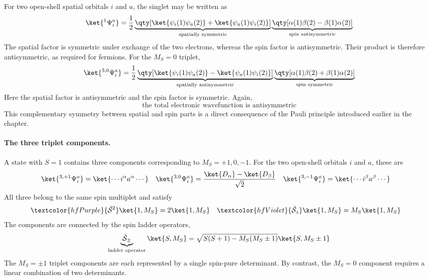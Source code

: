 \documentclass[11pt,a4paper,titlepage]{article}
\numberwithin{equation}{section}
\newcommand{\chS}{\Hat{\mathcal{S}}}
\newcommand{\purple}[1]{\textcolor{hfPurple}{#1}}
\newcommand{\red}[1]{\textcolor{hfRed}{#1}}
\newcommand{\green}[1]{\textcolor{hfGreen}{#1}}
\newcommand{\violet}[1]{\textcolor{hfViolet}{#1}}
\begin{document}
For two open-shell spatial orbitals $i$ and $a$, the singlet may be written
as
\begin{equation}
  \ket{{}^1\Psi_i^a}
  =
  \frac{1}{2}
  \underbrace{
  \qty[
    \ket{\psi_i(1)\psi_a(2)}
    +
    \ket{\psi_a(1)\psi_i(2)}
  ]}_{\text{spatially symmetric}}
  \underbrace{
  \qty[
    \alpha(1)\beta(2)
    -
    \beta(1)\alpha(2)
  ]}_{\text{spin antisymmetric}}
\end{equation}
The spatial factor is \green{symmetric} under exchange of the two electrons,
whereas the spin factor is \red{antisymmetric}. Their product is therefore
antisymmetric, as required for fermions.
For the $M_S=0$ triplet,
\begin{equation}
  \ket{{}^{3,0}\Psi_i^a}
  =
  \frac{1}{2}
  \underbrace{
  \qty[
    \ket{\psi_i(1)\psi_a(2)}
    -
    \ket{\psi_a(1)\psi_i(2)}
  ]}_{\text{spatially antisymmetric}}
  \underbrace{
  \qty[
    \alpha(1)\beta(2)
    +
    \beta(1)\alpha(2)
  ]}_{\text{spin symmetric}}
\end{equation}
Here the spatial factor is \red{antisymmetric} and the spin factor is
\green{symmetric}. Again,
\begin{equation}
  \text{the total electronic wavefunction is antisymmetric}
\end{equation}
This complementary symmetry between spatial and spin parts is a direct
consequence of the Pauli principle introduced earlier in the chapter.

\paragraph{The three triplet components.}

A state with $S=1$ contains three components corresponding to
$M_S=+1,0,-1$.
For the two open-shell orbitals $i$ and $a$, these are
\begin{align}
  \ket{{}^{3,+1}\Psi_i^a}
  &=
  \ket{\cdots i^\alpha a^\alpha\cdots}
  &
  \ket{{}^{3,0}\Psi_i^a}
  &=
  \frac{\ket{D_\alpha}-\ket{D_\beta}}{\sqrt{2}}
  &
  \ket{{}^{3,-1}\Psi_i^a}
  &=
  \ket{\cdots i^\beta a^\beta\cdots}
\end{align}
All three belong to the same spin multiplet and satisfy
\begin{align}
  \purple{\chS^2}\ket{1,M_S}
  &=
  2\ket{1,M_S}
  &
  \violet{\chS_z}\ket{1,M_S}
  &=
  M_S\ket{1,M_S}
\end{align}
The components are connected by the spin ladder operators,
\begin{equation}
  \underbrace{
  \chS_\pm
  }_{\text{ladder operator}}
  \ket{S,M_S}
  =
  \sqrt{
    S(S+1)-M_S(M_S\pm1)
  }
  \ket{S,M_S\pm1}
\end{equation}
The $M_S=\pm1$ triplet components are each represented by a single
spin-pure determinant. By contrast, the $M_S=0$ component requires a linear
combination of two determinants.
\end{document}
